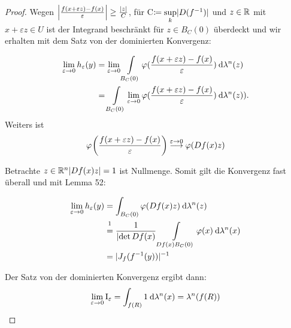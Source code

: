 \documentclass[skript.tex]{subfiles}
\begin{document}
\begin{proof}
		Wegen $\left| \frac{f(x+ \varepsilon z) - f(x)}{\varepsilon} \right| \geq \frac{\lvert z \rvert}{C}$, für C$\coloneqq \sup\limits_{k} \lvert D(f^{-1}) \rvert$ und $z \in \mathbb{R}$ mit $x + \varepsilon z \in U$ ist der Integrand beschränkt für $ z \in B_C(0)$ überdeckt und wir erhalten mit dem Satz von der dominierten Konvergenz:
	
		\begin{align*}
		\lim\limits_{\varepsilon \to 0} h_{\varepsilon}(y)
	&	= \lim\limits_{\varepsilon \to 0}  \int\limits_{B_C(0)} \varphi(\frac{f(x+ \varepsilon z) - f(x)}{\varepsilon}) \: \mathrm{d} \lambda^n(z) \\
    &	= \int\limits_{B_C(0)} \lim\limits_{\varepsilon \to 0} \varphi(\frac{f(x+ \varepsilon z) - f(x)}{\varepsilon}) \: \mathrm{d} \lambda^n(z)).
		\end{align*}
		Weiters ist
		\begin{equation*}
		\varphi\pr{\frac{f(x+ \varepsilon z) - f(x)}{\varepsilon}} \stackrel{ \varepsilon \to 0}{\lra} \varphi (Df(x)z)
		\end{equation*}
		
		Betrachte {$z \in \mathbb{R}^n \lvert Df(x)z \rvert = 1$} ist Nullmenge. Somit gilt die Konvergenz fast überall und mit Lemma 52:
		
		\begin{align*}
		\lim\limits_{\varepsilon \to 0} h_{\varepsilon}(y) &= \int_{B_C(0)} \varphi(Df(x)z) \md \lambda^n(z) \\
		&	\stackrel{\footnotemark}{=} \frac{1}{\lvert \det Df(x)} \lint_{Df(x)B_C(0)}\varphi(x) \md \lambda^n(x) \\
		&  =\lvert J_f (f^{-1}(y))\rvert^{-1}
		\end{align*}
		
		Der Satz von der dominierten Konvergenz ergibt dann:
		\begin{equation*}
		\lim\limits_{\varepsilon \to 0} \text{I}_{\varepsilon} = \int_{f(R)} 1 \: \mathrm{d} \lambda^n(x) = \lambda^n(f(R))
		\end{equation*}
		

\end{proof}
\end{document}
